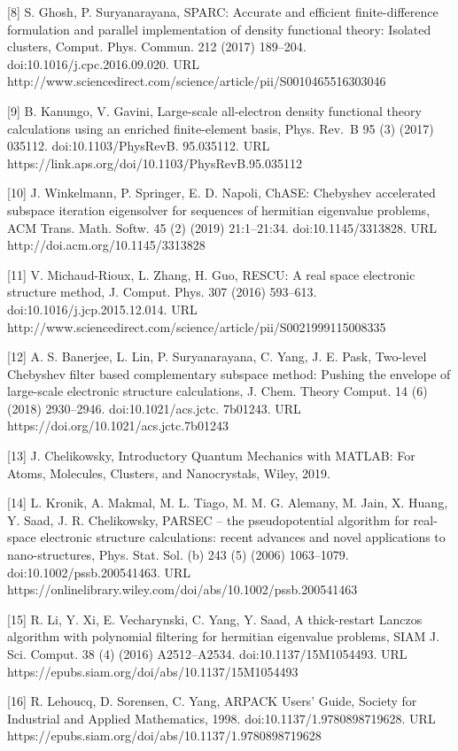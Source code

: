 \documentclass[
  10
]{article}
\begin{document}
{[}8{]} S. Ghosh, P. Suryanarayana, SPARC: Accurate and efficient
finite-difference formulation and parallel implementation of density
functional theory: Isolated clusters, Comput. Phys. Commun. 212 (2017)
189--204. doi:10.1016/j.cpc.2016.09.020. URL
http://www.sciencedirect.com/science/article/pii/S0010465516303046

{[}9{]} B. Kanungo, V. Gavini, Large-scale all-electron density
functional theory calculations using an enriched finite-element basis,
Phys. Rev.~B 95 (3) (2017) 035112. doi:10.1103/PhysRevB. 95.035112. URL
https://link.aps.org/doi/10.1103/PhysRevB.95.035112

{[}10{]} J. Winkelmann, P. Springer, E. D. Napoli, ChASE: Chebyshev
accelerated subspace iteration eigensolver for sequences of hermitian
eigenvalue problems, ACM Trans. Math. Softw. 45 (2) (2019) 21:1--21:34.
doi:10.1145/3313828. URL http://doi.acm.org/10.1145/3313828

{[}11{]} V. Michaud-Rioux, L. Zhang, H. Guo, RESCU: A real space
electronic structure method, J. Comput. Phys. 307 (2016) 593--613.
doi:10.1016/j.jcp.2015.12.014. URL
http://www.sciencedirect.com/science/article/pii/S0021999115008335

{[}12{]} A. S. Banerjee, L. Lin, P. Suryanarayana, C. Yang, J. E. Pask,
Two-level Chebyshev filter based complementary subspace method: Pushing
the envelope of large-scale electronic structure calculations, J. Chem.
Theory Comput. 14 (6) (2018) 2930--2946. doi:10.1021/acs.jctc. 7b01243.
URL https://doi.org/10.1021/acs.jctc.7b01243

{[}13{]} J. Chelikowsky, Introductory Quantum Mechanics with MATLAB: For
Atoms, Molecules, Clusters, and Nanocrystals, Wiley, 2019.

{[}14{]} L. Kronik, A. Makmal, M. L. Tiago, M. M. G. Alemany, M. Jain,
X. Huang, Y. Saad, J. R. Chelikowsky, PARSEC -- the pseudopotential
algorithm for real-space electronic structure calculations: recent
advances and novel applications to nano-structures, Phys. Stat. Sol. (b)
243 (5) (2006) 1063--1079. doi:10.1002/pssb.200541463. URL
https://onlinelibrary.wiley.com/doi/abs/10.1002/pssb.200541463

{[}15{]} R. Li, Y. Xi, E. Vecharynski, C. Yang, Y. Saad, A thick-restart
Lanczos algorithm with polynomial filtering for hermitian eigenvalue
problems, SIAM J. Sci. Comput. 38 (4) (2016) A2512--A2534.
doi:10.1137/15M1054493. URL
https://epubs.siam.org/doi/abs/10.1137/15M1054493

{[}16{]} R. Lehoucq, D. Sorensen, C. Yang, ARPACK Users' Guide, Society
for Industrial and Applied Mathematics, 1998.
doi:10.1137/1.9780898719628. URL
https://epubs.siam.org/doi/abs/10.1137/1.9780898719628
\end{document}
